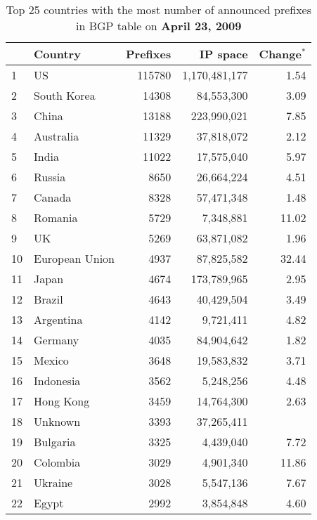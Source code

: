 	
\begin{table}[p]
	\begin{center}
	\caption{Top 25 countries with the most number of announced prefixes in BGP table on \textbf{April 23, 2009}}
	\label{tab:top25 bgp prefixes 2009}
	\begin{tabular}{|l||l|r|r|r|}
		\hline
		&      \bf Country		& \bf Prefixes  &       \bf IP space 	& \bf Change$^{*}$ 	\tabularnewline \hline 
1       &       US      		&       115780  &       1,170,481,177   & 1.54			\tabularnewline \hline
2       &       South Korea     &       14308   &       84,553,300      & 3.09			\tabularnewline \hline
3       &       China  			&       13188   &       223,990,021     & 7.85			\tabularnewline \hline
4       &       Australia       &       11329   &       37,818,072      & 2.12			\tabularnewline \hline
5       &       India   		&       11022   &       17,575,040      & 5.97			\tabularnewline \hline
6       &       Russia  		&       8650    &       26,664,224      & 4.51			\tabularnewline \hline
7       &       Canada  		&       8328    &       57,471,348      & 1.48			\tabularnewline \hline
8       &       Romania 		&       5729    &       7,348,881       & 11.02			\tabularnewline \hline
9       &       UK      		&       5269    &       63,871,082      & 1.96			\tabularnewline \hline
10      &       European Union  &       4937    &       87,825,582      & 32.44			\tabularnewline \hline
11      &       Japan   		&       4674    &       173,789,965     & 2.95			\tabularnewline \hline
12      &       Brazil  		&       4643    &       40,429,504      & 3.49			\tabularnewline \hline
13      &       Argentina       &       4142    &       9,721,411       & 4.82			\tabularnewline \hline
14      &       Germany 		&       4035    &       84,904,642      & 1.82			\tabularnewline \hline
15      &       Mexico  		&       3648    &       19,583,832      & 3.71			\tabularnewline \hline
16      &       Indonesia       &       3562    &       5,248,256       & 4.48			\tabularnewline \hline
17      &       Hong Kong       &       3459    &       14,764,300      & 2.63			\tabularnewline \hline
18      &       Unknown   		&       3393    &       37,265,411      & 				\tabularnewline \hline
19      &       Bulgaria        &       3325    &       4,439,040       & 7.72			\tabularnewline \hline
20      &       Colombia        &       3029    &       4,901,340       & 11.86			\tabularnewline \hline
21      &       Ukraine 		&       3028    &       5,547,136       & 7.67			\tabularnewline \hline
22      &       Egypt  			&       2992    &       3,854,848       & 4.60			\tabularnewline \hline

\end{tabular}
\end{center}
\end{table}
